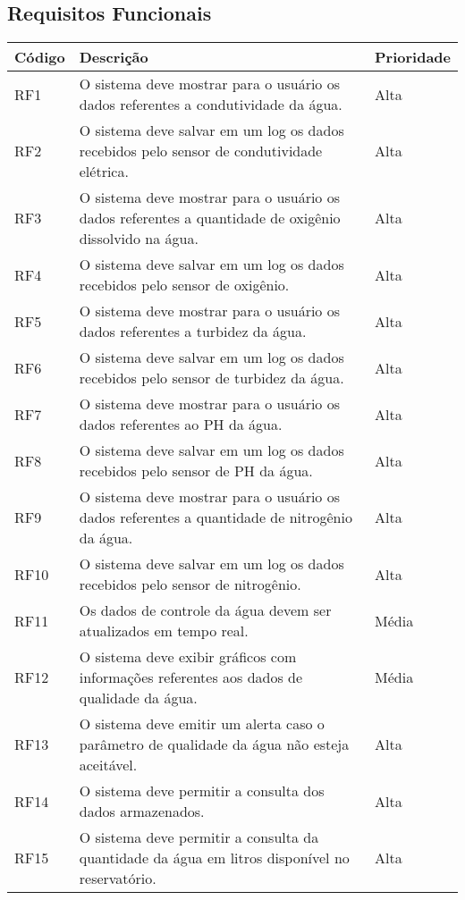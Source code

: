 \subsection*{Requisitos Funcionais}
\begin{longtable}{|p{4cm}|p{9cm}|p{2cm}|}\hline	
\textbf{Código}	& \textbf{Descrição} & \textbf{Prioridade}\\ \hline	
RF1	& O sistema deve mostrar para o usuário os dados referentes a condutividade da água.	& Alta\\ \hline
RF2	& O sistema deve salvar em um log os dados recebidos pelo sensor de condutividade elétrica.	& Alta\\ \hline
RF3	& O sistema deve mostrar para o usuário os dados referentes a quantidade de oxigênio dissolvido na água.	& Alta\\ \hline
RF4	& O sistema deve salvar em um log os dados recebidos pelo sensor de oxigênio.	& Alta\\ \hline
RF5	& O sistema deve mostrar para o usuário os dados referentes a turbidez da água.	& Alta\\ \hline
RF6	& O sistema deve salvar em um log os dados recebidos pelo sensor de turbidez da água.	& Alta\\ \hline
RF7	& O sistema deve mostrar para o usuário os dados referentes ao PH da água.	& Alta\\ \hline
RF8	& O sistema deve salvar em um log os dados recebidos pelo sensor de PH da água.& 	Alta\\ \hline
RF9	& O sistema deve mostrar para o usuário os dados referentes a quantidade de nitrogênio  da água.	& Alta\\ \hline
RF10 & 	O sistema deve salvar em um log os dados recebidos pelo sensor de nitrogênio.& 	Alta\\ \hline
RF11	& Os dados de controle da água devem ser atualizados em tempo real.			& Média\\ \hline
RF12	& O sistema deve exibir gráficos com informações referentes aos dados de qualidade da água.		& Média\\ \hline
RF13& 	O sistema deve emitir um alerta caso o parâmetro de qualidade da água não esteja aceitável.& 	Alta\\ \hline
RF14	& O sistema deve permitir a consulta dos dados armazenados.			& Alta\\ \hline
RF15& 	O sistema deve permitir a consulta da quantidade da água em litros disponível no reservatório.	& Alta\\ \hline

\end{longtable}
